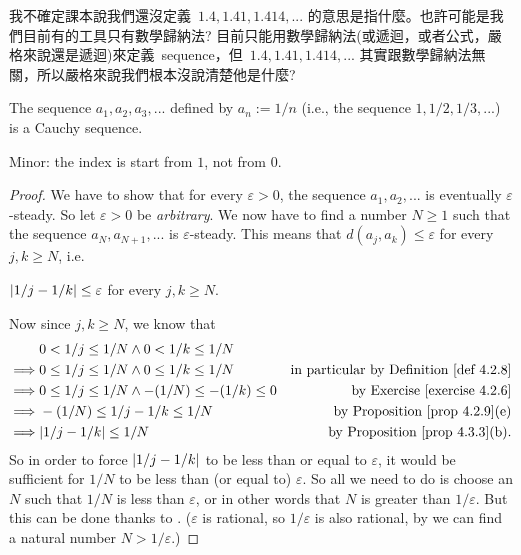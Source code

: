 \begin{note}
我不確定課本說我們還沒定義\ \(1.4, 1.41, 1.414, ...\) 的意思是指什麼。也許可能是我們目前有的工具只有數學歸納法? 目前只能用數學歸納法(或遞迴，或者公式，嚴格來說還是遞迴)來定義\ sequence，但\ \(1.4, 1.41, 1.414, ...\) 其實跟數學歸納法無關，所以嚴格來說我們根本沒說清楚他是什麼?
\end{note}

\begin{proposition} \label{prop 5.1.11}
\sloppy The sequence \(a_1, a_2, a_3,...\) defined by \(a_n := 1/n\) (i.e., the sequence \(1, 1/2, 1/3,...\)) is a Cauchy sequence.
\end{proposition}

\begin{note}
Minor: the index is start from \(1\), not from \(0\).
\end{note}

\begin{proof}
We have to show that for every \(\varepsilon > 0\), the sequence \(a_1, a_2,...\) is eventually \(\varepsilon\)-steady.
So let \(\varepsilon > 0\) be \emph{arbitrary}.
We now have to find a number \(N \ge 1\) such that the sequence \(a_N, a_{N + 1},...\) is \(\varepsilon\)-steady.
This means that \(d(a_j, a_k) \le \varepsilon\) for every \(j, k \ge N\), i.e.
\begin{center}
    \(\lvert1 / j - 1 / k\rvert \le \varepsilon\) for every \(j, k \ge N\).
\end{center}
Now since \(j, k \ge N\), we know that
\begin{align*}
             & 0 < 1 / j \le 1 / N \land 0 < 1 / k \le 1 / N \\
    \implies & 0 \le 1 / j \le 1 / N \land 0 \le 1 / k \le 1 / N & \text{in particular by \DEF{4.2.8}} \\
    \implies & 0 \le 1 / j \le 1 / N \land -(1 / N) \le - (1 / k) \le 0 & \text{by \EXEC{4.2.6}} \\
    \implies & -(1 / N) \le 1 / j - 1 / k \le 1 / N & \text{by \PROP{4.2.9}(e)} \\
    \implies & \abs{1 / j - 1 / k} \le 1 / N & \text{by \PROP{4.3.3}(b)}.
\end{align*}
So in order to force \(\lvert1 / j - 1 / k\rvert\) to be less than or equal to \(\varepsilon\), it would be sufficient for \(1/N\) to be less than (or equal to) \(\varepsilon\).
So all we need to do is choose an \(N\) such that \(1 / N\) is less than \(\varepsilon\), or in other words that \(N\) is
greater than \(1/\varepsilon\).
But this can be done thanks to .
(\(\varepsilon\) is rational, so \(1/\varepsilon\) is also rational, by  we can find a natural number \(N > 1/\varepsilon\).)
\end{proof}

